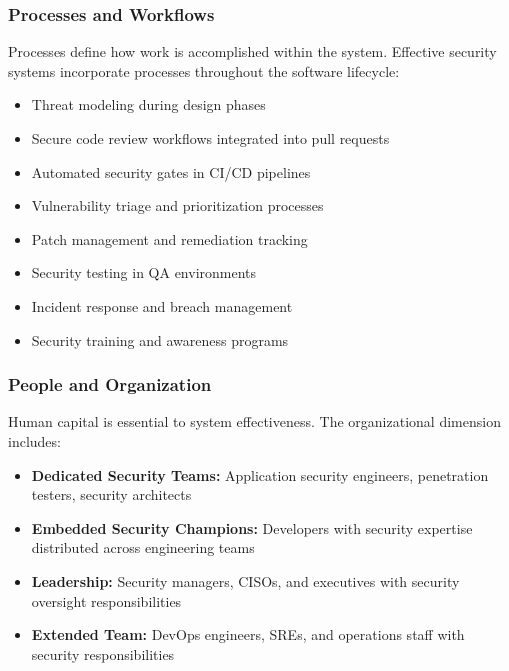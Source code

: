 \documentclass[11pt,letterpaper]{article}
\begin{document}
\subsubsection{Processes and Workflows}

Processes define how work is accomplished within the system. Effective security systems incorporate processes throughout the software lifecycle:

\begin{examplebox}
\begin{itemize}[leftmargin=1.5em, itemsep=0.2em]
    \item Threat modeling during design phases
    \item Secure code review workflows integrated into pull requests
    \item Automated security gates in CI/CD pipelines
    \item Vulnerability triage and prioritization processes
    \item Patch management and remediation tracking
    \item Security testing in QA environments
    \item Incident response and breach management
    \item Security training and awareness programs
\end{itemize}
\end{examplebox}

\subsubsection{People and Organization}

Human capital is essential to system effectiveness. The organizational dimension includes:

\begin{itemize}[leftmargin=2em]
    \item \textbf{Dedicated Security Teams:} Application security engineers, penetration testers, security architects
    \item \textbf{Embedded Security Champions:} Developers with security expertise distributed across engineering teams
    \item \textbf{Leadership:} Security managers, CISOs, and executives with security oversight responsibilities
    \item \textbf{Extended Team:} DevOps engineers, SREs, and operations staff with security responsibilities
\end{itemize}
\end{document}
